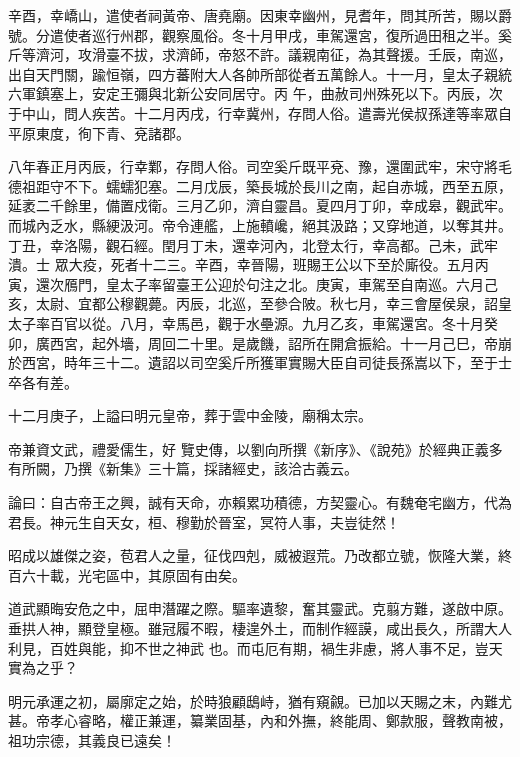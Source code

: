 \begin{pinyinscope}
 辛酉，幸嶠山，遣使者祠黃帝、唐堯廟。因東幸幽州，見耆年，問其所苦，賜以爵號。分遣使者巡行州郡，觀察風俗。冬十月甲戌，車駕還宮，復所過田租之半。奚斤等濟河，攻滑臺不拔，求濟師，帝怒不許。議親南征，為其聲援。壬辰，南巡，出自天門關，踰恒嶺，四方蕃附大人各帥所部從者五萬餘人。十一月，皇太子親統六軍鎮塞上，安定王彌與北新公安同居守。丙
 午，曲赦司州殊死以下。丙辰，次于中山，問人疾苦。十二月丙戌，行幸冀州，存問人俗。遣壽光侯叔孫達等率眾自平原東度，徇下青、兗諸郡。



 八年春正月丙辰，行幸鄴，存問人俗。司空奚斤既平兗、豫，還圍武牢，宋守將毛德祖距守不下。蠕蠕犯塞。二月戊辰，築長城於長川之南，起自赤城，西至五原，延袤二千餘里，備置戍衛。三月乙卯，濟自靈昌。夏四月丁卯，幸成皋，觀武牢。而城內乏水，縣綆汲河。帝令連艦，上施轒巉，絕其汲路；又穿地道，以奪其井。丁丑，幸洛陽，觀石經。閏月丁未，還幸河內，北登太行，幸高都。己未，武牢潰。士
 眾大疫，死者十二三。辛酉，幸晉陽，班賜王公以下至於廝役。五月丙寅，還次鴈門，皇太子率留臺王公迎於句注之北。庚寅，車駕至自南巡。六月己亥，太尉、宜都公穆觀薨。丙辰，北巡，至參合陂。秋七月，幸三會屋侯泉，詔皇太子率百官以從。八月，幸馬邑，觀于水壘源。九月乙亥，車駕還宮。冬十月癸卯，廣西宮，起外墻，周回二十里。是歲饑，詔所在開倉振給。十一月己巳，帝崩於西宮，時年三十二。遺詔以司空奚斤所獲軍實賜大臣自司徒長孫嵩以下，至于士卒各有差。



 十二月庚子，上謚曰明元皇帝，葬于雲中金陵，廟稱太宗。



 帝兼資文武，禮愛儒生，好
 覽史傳，以劉向所撰《新序》、《說苑》於經典正義多有所闕，乃撰《新集》三十篇，採諸經史，該洽古義云。



 論曰：自古帝王之興，誠有天命，亦賴累功積德，方契靈心。有魏奄宅幽方，代為君長。神元生自天女，桓、穆勤於晉室，冥符人事，夫豈徒然！



 昭成以雄傑之姿，苞君人之量，征伐四剋，威被遐荒。乃改都立號，恢隆大業，終百六十載，光宅區中，其原固有由矣。



 道武顯晦安危之中，屈申潛躍之際。驅率遺黎，奮其靈武。克翦方難，遂啟中原。垂拱人神，顯登皇極。雖冠履不暇，棲遑外土，而制作經謨，咸出長久，所謂大人利見，百姓與能，抑不世之神武
 也。而屯厄有期，禍生非慮，將人事不足，豈天實為之乎？



 明元承運之初，屬廓定之始，於時狼顧鴟峙，猶有窺覦。已加以天賜之末，內難尤甚。帝孝心睿略，權正兼運，纂業固基，內和外撫，終能周、鄭款服，聲教南被，祖功宗德，其義良已遠矣！



\end{pinyinscope}